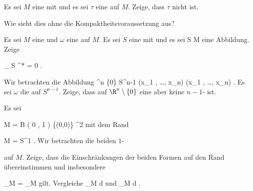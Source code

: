 {}
{

Es sei $M$ eine
 {} {}
mit
und es sei $\tau$ eine
auf $M$. Zeige, dass $\tau$ nicht
ist.

}
{Wie sieht dies ohne die Kompaktheitsvoraussetzung aus?} {}

{}
{

Es sei $M$ eine
und $\omega$ eine
 
auf $M$. Es sei $S$ eine
 {} {}
mit
und es sei
\maabbdisp {\varphi} { S } { M
} {}
eine
Abbildung. Zeige

\mavergleichskettedisp
{\vergleichskette
{
\int_{  S  }   \varphi^*\omega
}
{ =} { 0
}
{ } {
}
{ } {
}
{ } {
}
}
{}{}{.}

}
{} {}

{}
{

Wir betrachten die
Abbildung
 {} {}
\maabbeledisp {\pi} {\R^n \setminus \{0\}} { S^{n-1}
} {(x_1 , \ldots , x_n) } { {  } (x_1 , \ldots , x_n)
} {.}
Es sei $\omega$ die
auf $S^{n-1}$. Zeige, dass
\mathl{\pi^* \omega}{} auf $\R^n \setminus \{0\}$ eine
aber keine
$n-1$-
ist.

}
{} {}

{}
{

Es sei

\mavergleichskette
{\vergleichskette
{ M
}
{ = }{ B  \left(  0 , 1 \right) \setminus \{(0,0)\}
}
{ \subset }{ \R^2
}
{    }{
}
{   }{
}
}
{}{}{}
mit dem Rand

\mavergleichskette
{\vergleichskette
{ \partial M
}
{ = }{ S^1
}
{  }{
}
{    }{
}
{   }{
}
}
{}{}{.}
Wir betrachten die beiden
$1$-

 {  }

auf $M$. Zeige, dass die Einschränkungen der beiden Formen auf den Rand übereinstimmen und insbesondere

\mavergleichskette
{\vergleichskette
{ \int_{\partial M} \omega
}
{ = }{ \int_{\partial M} \tau
}
{  }{
}
{    }{
}
{   }{
}
}
{}{}{}
gilt. Vergleiche
\mathkor {} {\int_M d \omega} {und} {\int_M d \tau} {.}

}
{} {}

